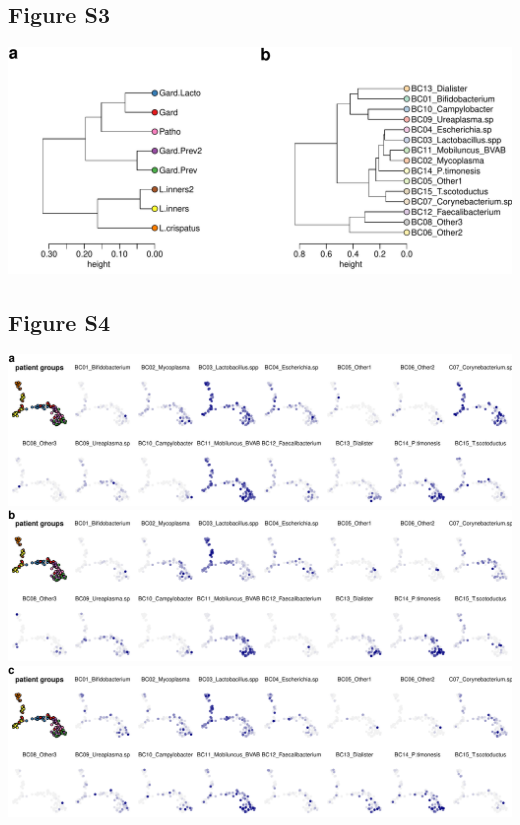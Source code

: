 \documentclass[
]{article}
\begin{document}
\clearpage

\hypertarget{figure-s3}{%
\subsection{Figure S3}\label{figure-s3}}

\includegraphics[width=1\linewidth]{manuscript_template_files/figure-latex/unnamed-chunk-12-1}

\clearpage

\hypertarget{figure-s4}{%
\subsection{Figure S4}\label{figure-s4}}

\includegraphics[width=1\linewidth]{manuscript_template_files/figure-latex/unnamed-chunk-13-1}
\includegraphics[width=1\linewidth]{manuscript_template_files/figure-latex/unnamed-chunk-13-2}
\includegraphics[width=1\linewidth]{manuscript_template_files/figure-latex/unnamed-chunk-13-3}
\end{document}
